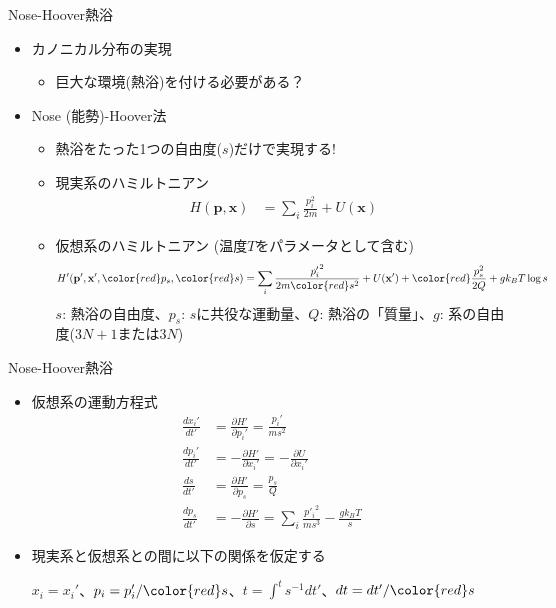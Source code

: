 \documentclass[dvipdfmx]{beamer}
\begin{document}






\begin{frame}[t,fragile]{Nose-Hoover熱浴}
  \begin{itemize}
  \item カノニカル分布の実現
    \begin{itemize}
    \item 巨大な環境(熱浴)を付ける必要がある？
    \end{itemize}
  \item Nose (能勢)-Hoover法
    \begin{itemize}
    \item 熱浴をたった1つの自由度($s$)だけで実現する!
    \item 現実系のハミルトニアン
      \begin{align*}
        H(\mathbf{p},\mathbf{x}) &= \sum_i \frac{p_i^2}{2m} + U(\mathbf{x})
      \end{align*}
    \item 仮想系のハミルトニアン (温度$T$をパラメータとして含む)
      \begin{align*}
        H'(\mathbf{p}',\mathbf{x}',{\color{red}p_s},{\color{red}s}) &= \sum_i \frac{{p'_i}^2}{2m{\color{red}s^2}} + U(\mathbf{x}') + {\color{red}\frac{p_s^2}{2Q} + g k_B T\log s}
      \end{align*}
      $s$: 熱浴の自由度、$p_s$: $s$に共役な運動量、$Q$: 熱浴の「質量」、$g$: 系の自由度($3N+1$または$3N$)
    \end{itemize}
  \end{itemize}
\end{frame}

\begin{frame}[t,fragile]{Nose-Hoover熱浴}
  \begin{itemize}
  \item 仮想系の運動方程式
    \begin{align*}
      \frac{dx_i'}{dt'} &= \frac{\partial H'}{\partial p_i'} = \frac{p_i'}{ms^2} \\
      \frac{dp_i'}{dt'} &= -\frac{\partial H'}{\partial x_i'} = -\frac{\partial U}{\partial x_i'} \\
      \frac{ds}{dt'} &= \frac{\partial H'}{\partial p_s} = \frac{p_s}{Q} \\
      \frac{dp_s}{dt'} &= -\frac{\partial H'}{\partial s} = \sum_i \frac{{p'_i}^2}{ms^3} - \frac{g k_B T}{s}
    \end{align*}
  \item 現実系と仮想系との間に以下の関係を仮定する

    $x_i=x_i'$、$p_i=p_i'/{\color{red}s}$、$t=\int^t s^{-1} dt'$、$dt=dt'/{\color{red}s}$
  \end{itemize}
\end{frame}
\end{document}
